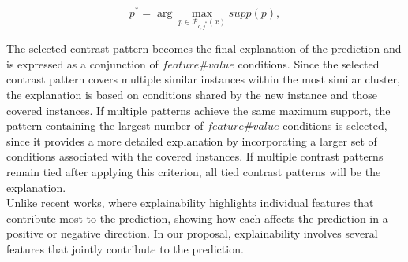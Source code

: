        \begin{equation}
       	p^* = \arg\max_{p \in \mathcal{P}_{c,j^*}(x)} supp(p),
       	\label{eq:pattern_selection}
       \end{equation}
       
		The selected contrast pattern becomes the final explanation of the prediction and is expressed as a conjunction of $feature\#value$ conditions. Since the selected contrast pattern covers multiple similar instances within the most similar cluster, the explanation is based on conditions shared by the new instance and those covered instances. If multiple patterns achieve the same maximum support, the pattern containing the largest number of $feature\#value$ conditions is selected, since it provides a more detailed explanation by incorporating a larger set of conditions associated with the covered instances. If multiple contrast patterns remain tied after applying this criterion, all tied contrast patterns will be the explanation. \\
		
		Unlike recent works, where explainability highlights individual features that contribute most to the prediction, showing how each affects the prediction in a positive or negative direction. In our proposal, explainability involves several features that jointly contribute to the prediction.
       
